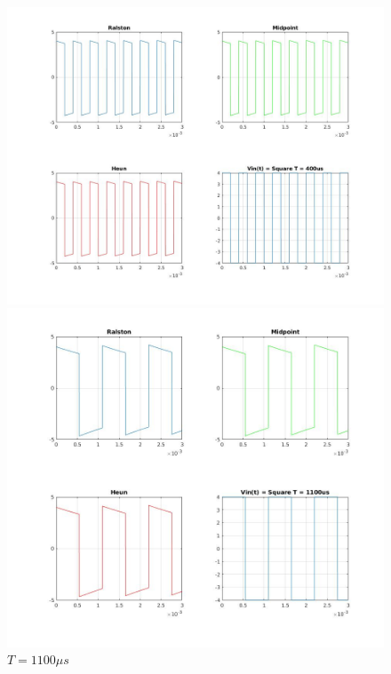 \documentclass[11pt,a4paper]{article}
\begin{document}
	\begin{figure}[H]
		\vspace{-5mm}
		\centering
		\includegraphics[width=\textwidth]{Ex1_Figs/squ400.jpg}
		\vspace{-15mm}
		\caption{$T = 400 \mu s$}
		\label{fig:RL4}
		\includegraphics[width=\textwidth]{Ex1_Figs/squ1100.jpg}
		\vspace{-15mm}
		\caption{$T = 1100 \mu s$}
		\label{fig:RL4}
	\end{figure}
\end{document}
